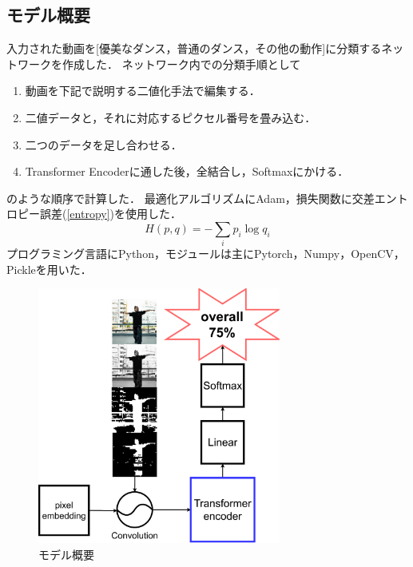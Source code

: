 \subsection{モデル概要}
入力された動画を[優美なダンス，普通のダンス，その他の動作]に分類するネットワークを作成した．
ネットワーク内での分類手順として
\begin{enumerate}
  \item 動画を下記で説明する二値化手法で編集する．
  \item 二値データと，それに対応するピクセル番号を畳み込む．
  \item 二つのデータを足し合わせる．
  \item Transformer Encoderに通した後，全結合し，Softmaxにかける．
\end{enumerate}
のような順序で計算した．
最適化アルゴリズムにAdam\cite{adam}，損失関数に交差エントロピー誤差(\ref{entropy})を使用した．
\begin{equation}
  H(p, q) = -\sum_{i}p_i\log q_i
  \label{entropy}
\end{equation}
プログラミング言語にPython，モジュールは主にPytorch，Numpy，OpenCV，Pickleを用いた．

\begin{figure}[b]
  \begin{center}
    \includegraphics[width=80mm]{images/easy_chart.pdf}
  \end{center}
  \caption{モデル概要}
  \label{easy_chart}
\end{figure}

\clearpage


